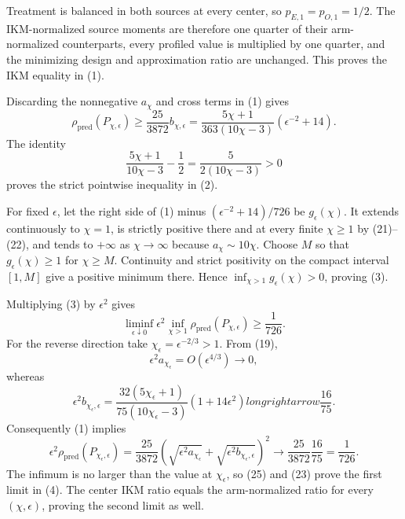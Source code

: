 Treatment is balanced in both sources at every center, so \(p_{E,1}=p_{O,1}=1/2\). The IKM-normalized source moments are therefore one quarter of their arm-normalized counterparts, every profiled value is multiplied by one quarter, and the minimizing design and approximation ratio are unchanged. This proves the IKM equality in (1).

Discarding the nonnegative \(a_\chi\) and cross terms in (1) gives
\[
 \rho_{\mathrm{pred}}(P_{\chi,\epsilon})
 \ge \frac{25}{3872}b_{\chi,\epsilon}
 =\frac{5\chi+1}{363(10\chi-3)}(\epsilon^{-2}+14).     \tag{21}
\]
The identity
\[
 \frac{5\chi+1}{10\chi-3}-\frac12
 =\frac5{2(10\chi-3)}>0                               \tag{22}
\]
proves the strict pointwise inequality in (2).

For fixed \(\epsilon\), let the right side of (1) minus \((\epsilon^{-2}+14)/726\) be \(g_\epsilon(\chi)\). It extends continuously to \(\chi=1\), is strictly positive there and at every finite \(\chi\ge1\) by (21)--(22), and tends to \(+\infty\) as \(\chi\to\infty\) because \(a_\chi\sim10\chi\). Choose \(M\) so that \(g_\epsilon(\chi)\ge1\) for \(\chi\ge M\). Continuity and strict positivity on the compact interval \([1,M]\) give a positive minimum there. Hence \(\inf_{\chi>1}g_\epsilon(\chi)>0\), proving (3).

Multiplying (3) by \(\epsilon^2\) gives
\[
 \liminf_{\epsilon\downarrow0}\epsilon^2
 \inf_{\chi>1}\rho_{\mathrm{pred}}(P_{\chi,\epsilon})
 \ge\frac1{726}.                                      \tag{23}
\]
For the reverse direction take \(\chi_\epsilon=\epsilon^{-2/3}>1\). From (19),
\[
 \epsilon^2a_{\chi_\epsilon}=O(\epsilon^{4/3})\longrightarrow0,
\]
whereas
\[
 \epsilon^2b_{\chi_\epsilon,\epsilon}
 =\frac{32(5\chi_\epsilon+1)}{75(10\chi_\epsilon-3)}
 (1+14\epsilon^2)longrightarrow\frac{16}{75}.         \tag{24}
\]
Consequently (1) implies
\[
 \epsilon^2\rho_{\mathrm{pred}}(P_{\chi_\epsilon,\epsilon})
 =\frac{25}{3872}
 \left(\sqrt{\epsilon^2a_{\chi_\epsilon}}
 +\sqrt{\epsilon^2b_{\chi_\epsilon,\epsilon}}\right)^2
 \longrightarrow \frac{25}{3872}\frac{16}{75}
 =\frac1{726}.                                        \tag{25}
\]
The infimum is no larger than the value at \(\chi_\epsilon\), so (25) and (23) prove the first limit in (4). The center IKM ratio equals the arm-normalized ratio for every \((\chi,\epsilon)\), proving the second limit as well.